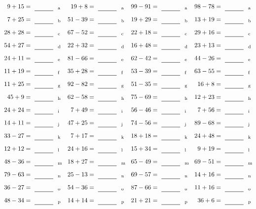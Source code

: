 \documentclass
[
  draft    = true,
  fontsize = 11pt,
  parskip  = half-
]
{scrartcl}
\begin{document}
\clearpage
\begin{align*}
    \pline{9+15}&=\rline{a}
  & \pline{19+8}&=\rline{a}
  & \pline{99-91}&=\rline{a}
  & \pline{98-78}&=\rline{a} \\[1ex]
    \pline{7+25}&=\rline{b}
  & \pline{51-39}&=\rline{b}
  & \pline{19+29}&=\rline{b}
  & \pline{13+19}&=\rline{b} \\[1ex]
    \pline{28+28}&=\rline{c}
  & \pline{67-52}&=\rline{c}
  & \pline{22+18}&=\rline{c}
  & \pline{29+16}&=\rline{c} \\[1ex]
    \pline{54+27}&=\rline{d}
  & \pline{22+32}&=\rline{d}
  & \pline{16+48}&=\rline{d}
  & \pline{23+13}&=\rline{d} \\[1ex]
    \pline{24+11}&=\rline{e}
  & \pline{81-66}&=\rline{e}
  & \pline{62-42}&=\rline{e}
  & \pline{44-26}&=\rline{e} \\[1ex]
    \pline{11+19}&=\rline{f}
  & \pline{35+28}&=\rline{f}
  & \pline{53-39}&=\rline{f}
  & \pline{63-55}&=\rline{f} \\[1ex]
    \pline{11+25}&=\rline{g}
  & \pline{92-82}&=\rline{g}
  & \pline{51-35}&=\rline{g}
  & \pline{16+8}&=\rline{g} \\[1ex]
    \pline{45+9}&=\rline{h}
  & \pline{62-58}&=\rline{h}
  & \pline{75-69}&=\rline{h}
  & \pline{12+23}&=\rline{h} \\[1ex]
    \pline{24+24}&=\rline{i}
  & \pline{7+49}&=\rline{i}
  & \pline{56-46}&=\rline{i}
  & \pline{7+56}&=\rline{i} \\[1ex]
    \pline{14+11}&=\rline{j}
  & \pline{47+25}&=\rline{j}
  & \pline{74-56}&=\rline{j}
  & \pline{89-68}&=\rline{j} \\[1ex]
    \pline{33-27}&=\rline{k}
  & \pline{7+17}&=\rline{k}
  & \pline{18+18}&=\rline{k}
  & \pline{24+48}&=\rline{k} \\[1ex]
    \pline{12+12}&=\rline{l}
  & \pline{24+16}&=\rline{l}
  & \pline{15+34}&=\rline{l}
  & \pline{9+19}&=\rline{l} \\[1ex]
    \pline{48-36}&=\rline{m}
  & \pline{18+27}&=\rline{m}
  & \pline{65-49}&=\rline{m}
  & \pline{69-51}&=\rline{m} \\[1ex]
    \pline{79-63}&=\rline{n}
  & \pline{25-13}&=\rline{n}
  & \pline{69-57}&=\rline{n}
  & \pline{14+16}&=\rline{n} \\[1ex]
    \pline{36-27}&=\rline{o}
  & \pline{54-36}&=\rline{o}
  & \pline{87-66}&=\rline{o}
  & \pline{11+16}&=\rline{o} \\[1ex]
    \pline{48-34}&=\rline{p}
  & \pline{14+14}&=\rline{p}
  & \pline{21+21}&=\rline{p}
  & \pline{36+6}&=\rline{p}
\end{align*}
\end{document}
